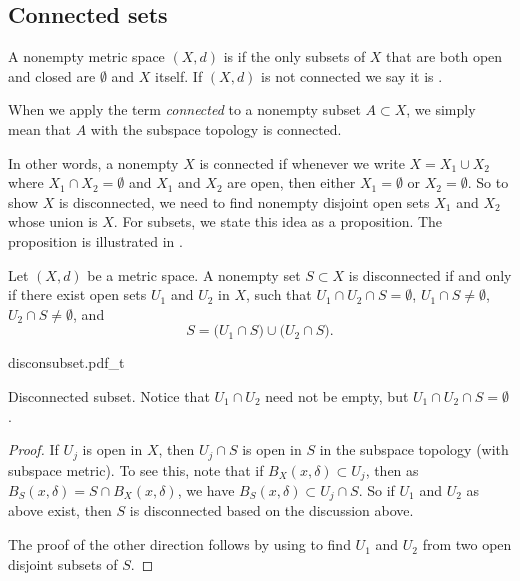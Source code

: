 \subsection{Connected sets}

\begin{defn}
A nonempty
metric space $(X,d)$ is \emph{} if the
only subsets of $X$ that are both open and closed are $\emptyset$ and $X$ itself.
If $(X,d)$ is not connected we say it is
\emph{}.

When we apply the term \emph{connected} to a nonempty subset $A \subset X$, we simply
mean that $A$ with the subspace topology is connected.
\end{defn}

In other words, a nonempty $X$ is connected if whenever we write
$X = X_1 \cup X_2$ where $X_1 \cap X_2 = \emptyset$ and $X_1$ and $X_2$ are
open, then either $X_1 = \emptyset$ or $X_2 = \emptyset$.
So to show $X$ is disconnected, we need to find nonempty
disjoint open sets $X_1$ and
$X_2$ whose union is $X$.
For subsets, we state this idea as a proposition.
The proposition is illustrated in .

\begin{prop}
Let $(X,d)$ be a metric space.
A nonempty set $S \subset X$ is disconnected if and only if
there exist open sets $U_1$ and
$U_2$ in $X$, such that $U_1 \cap U_2 \cap S = \emptyset$,
$U_1 \cap S \not= \emptyset$,
$U_2 \cap S \not= \emptyset$, and
\begin{equation*}
S = 
\bigl( U_1 \cap S \bigr)
\cup
\bigl( U_2 \cap S \bigr) .
\end{equation*}
\end{prop}

\begin{myfigureht}
{disconsubset.pdf_t}
\caption{Disconnected subset.  Notice that $U_1 \cap U_2$ need
not be empty, but $U_1 \cap U_2 \cap S = \emptyset$.\label{fig:disconsubset}}
\end{myfigureht}


\begin{proof}
If $U_j$ is open in $X$,
then $U_j \cap S$ is open in $S$ in the subspace topology (with subspace
metric).  To see this,
note that if $B_X(x,\delta) \subset U_j$, then as
$B_S(x,\delta) = S \cap B_X(x,\delta)$,
we have $B_S(x,\delta) \subset U_j \cap S$.
So if $U_1$ and $U_2$ as above exist, then
$S$ is disconnected based on the discussion above.

The proof of the other direction follows by using
 to find $U_1$ and $U_2$ from two
open disjoint subsets of $S$.
\end{proof}


